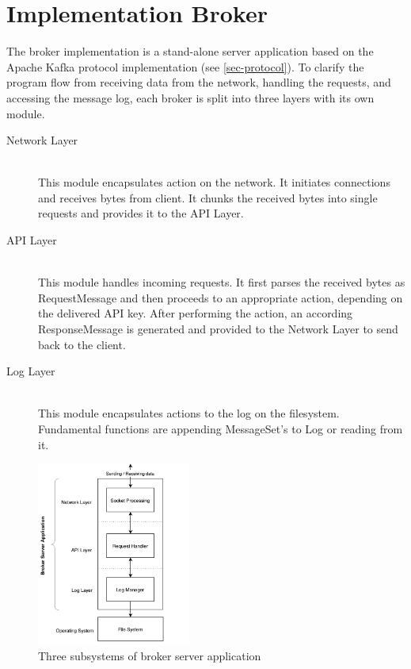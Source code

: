 \chapter{Implementation Broker}
\label{chap:broker}
The broker implementation is a stand-alone server application based on the
Apache Kafka protocol implementation (see \ref{sec-protocol}). To clarify the
program flow from receiving data from the network, handling the requests, and
accessing the message log, each broker is split into three
layers with its own module. 

\begin{description}
    \item [Network Layer] \hfill \\
        This module encapsulates action on the network. It initiates
        connections and receives bytes from client. It chunks the received bytes
        into single requests and provides it to the API Layer. 
    \item [API Layer] \hfill \\
        This module handles incoming requests. It first parses the
        received bytes as RequestMessage and then proceeds to an appropriate action,
        depending on the delivered API key. After performing the action, an
        according ResponseMessage is generated and provided to the Network Layer
        to send back to the client. 
    \item [Log Layer] \hfill \\
        This module encapsulates actions to the log on the filesystem.
        Fundamental functions are appending MessageSet's to Log or reading from
        it. 
\end{description}

\begin{figure}[H]
    \centering
    \includegraphics[width=0.45\textwidth]{images/impl-brok-layers.png}
    \caption{Three subsystems of broker server application}
    \label{fig:impl-brok-layers}
\end{figure}

